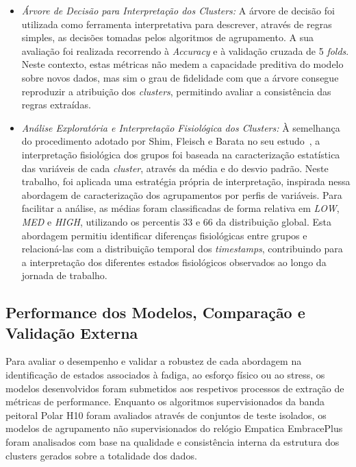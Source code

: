 \begin{itemize}
\item \textit{Árvore de Decisão para Interpretação dos Clusters:} A árvore de decisão foi utilizada como ferramenta interpretativa para descrever, através de regras simples, as decisões tomadas pelos algoritmos de agrupamento. A sua avaliação foi realizada recorrendo à \textit{Accuracy} e à validação cruzada de 5 \textit{folds}. Neste contexto, estas métricas não medem a capacidade preditiva do modelo sobre novos dados, mas sim o grau de fidelidade com que a árvore consegue reproduzir a atribuição dos \textit{clusters}, permitindo avaliar a consistência das regras extraídas.

\item \textit{Análise Exploratória e Interpretação Fisiológica dos Clusters:} À semelhança do procedimento adotado por Shim, Fleisch e Barata no seu estudo~\cite{shim2023wearable}, a interpretação fisiológica dos grupos foi baseada na caracterização estatística das variáveis de cada \textit{cluster}, através da média e do desvio padrão. Neste trabalho, foi aplicada uma estratégia própria de interpretação, inspirada nessa abordagem de caracterização dos agrupamentos por perfis de variáveis. Para facilitar a análise, as médias foram classificadas de forma relativa em \textit{LOW}, \textit{MED} e \textit{HIGH}, utilizando os percentis 33 e 66 da distribuição global. Esta abordagem permitiu identificar diferenças fisiológicas entre grupos e relacioná-las com a distribuição temporal dos \textit{timestamps}, contribuindo para a interpretação dos diferentes estados fisiológicos observados ao longo da jornada de trabalho.

\end{itemize}

\subsection{Performance dos Modelos, Comparação e Validação Externa}

Para avaliar o desempenho e validar a robustez de cada abordagem na identificação de estados associados à fadiga, ao esforço físico ou ao stress, os modelos desenvolvidos foram submetidos aos respetivos processos de extração de métricas de performance. Enquanto os algoritmos supervisionados da banda peitoral Polar H10 foram avaliados através de conjuntos de teste isolados, os modelos de agrupamento não supervisionados do relógio Empatica EmbracePlus foram analisados com base na qualidade e consistência interna da estrutura dos clusters gerados sobre a totalidade dos dados.

